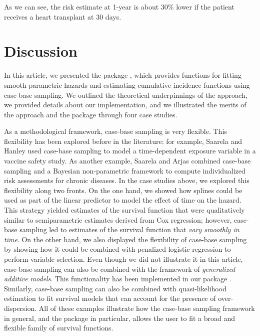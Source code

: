 \documentclass[
]{jss}
\begin{document}
As we can see, the risk estimate at 1-year is about 30\% lower if the
patient receives a heart transplant at 30 days.

\hypertarget{discussion}{%
\section{Discussion}\label{discussion}}

In this article, we presented the  package ,
which provides functions for fitting smooth parametric hazards and
estimating cumulative incidence functions using case-base sampling. We
outlined the theoretical underpinnings of the approach, we provided
details about our implementation, and we illustrated the merits of the
approach and the package through four case studies.

As a methodological framework, case-base sampling is very flexible. This
flexibility has been explored before in the literature: for example,
Saarela and Hanley \citeyearpar{saarela2015case} used case-base sampling
to model a time-dependent exposure variable in a vaccine safety study.
As another example, Saarela and Arjas \citeyearpar{saarela2015non}
combined case-base sampling and a Bayesian non-parametric framework to
compute individualized risk assessments for chronic diseases. In the
case studies above, we explored this flexibility along two fronts. On
the one hand, we showed how splines could be used as part of the linear
predictor to model the effect of time on the hazard. This strategy
yielded estimates of the survival function that were qualitatively
similar to semiparametric estimates derived from Cox regression;
however, case-base sampling led to estimates of the survival function
that \emph{vary smoothly in time}. On the other hand, we also displayed
the flexibility of case-base sampling by showing how it could be
combined with penalized logistic regression to perform variable
selection. Even though we did not illustrate it in this article,
case-base sampling can also be combined with the framework of
\emph{generalized additive models}. This functionality has been
implemented in our package . Similarly, case-base sampling
can also be combined with quasi-likelihood estimation to fit survival
models that can account for the presence of over-dispersion. All of
these examples illustrate how the case-base sampling framework in
general, and the package  in particular, allows the user
to fit a broad and flexible family of survival functions.
\end{document}
